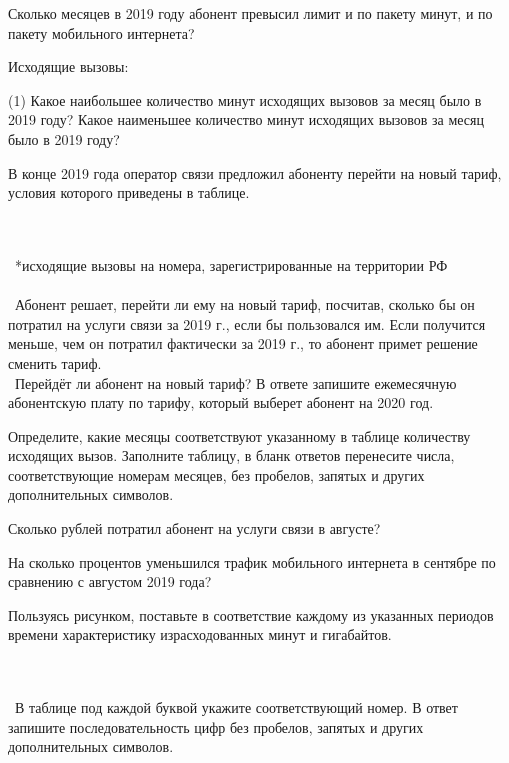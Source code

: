 \begin{class}[number=7]
\begin{listofex}
		\item Сколько месяцев в 2019 году абонент превысил лимит и по пакету минут, и по пакету мобильного интернета?
		\item Исходящие вызовы:
		\begin{tasks}(1)
			\task[A)]  Какое наибольшее количество минут исходящих вызовов за месяц было в 2019 году?
			\task[Б)] Какое наименьшее количество минут исходящих вызовов за месяц было в 2019 году? 
		\end{tasks}
		\item В конце 2019 года оператор связи предложил абоненту перейти на новый тариф, условия которого приведены в таблице.\\\
		\begin{figure}[h]
		\end{figure}
		\\\ *исходящие вызовы на номера, зарегистрированные на территории РФ
		\\\ 
		\\\ Абонент решает, перейти ли ему на новый тариф, посчитав, сколько бы он потратил на услуги связи за 2019 г., если бы пользовался им. Если получится меньше, чем он потратил фактически за 2019 г., то абонент примет решение сменить тариф. 
		\\\ Перейдёт ли абонент на новый тариф? В ответе запишите ежемесячную абонентскую плату по тарифу, который выберет абонент на 2020 год.
			\end{listofex}
	
\begin{listofex}
	 	\item Определите, какие месяцы соответствуют указанному в таблице количеству исходящих вызов. Заполните таблицу, в бланк ответов перенесите числа, соответствующие номерам месяцев, без пробелов, запятых и других дополнительных символов.
		\begin{figure}[h]
		\end{figure}
		\item Сколько рублей потратил абонент на услуги связи в августе?
		\item На сколько процентов уменьшился трафик мобильного интернета в сентябре по сравнению с августом 2019 года?
		\item Пользуясь рисунком, поставьте в соответствие каждому из указанных периодов времени характеристику израсходованных минут и гигабайтов.
		\\\	\begin{figure}[h]
		\end{figure}\\\
		В таблице под каждой буквой укажите соответствующий номер. В ответ запишите последовательность цифр без пробелов, запятых и других дополнительных символов.
	 

\end{listofex}
\end{class}
